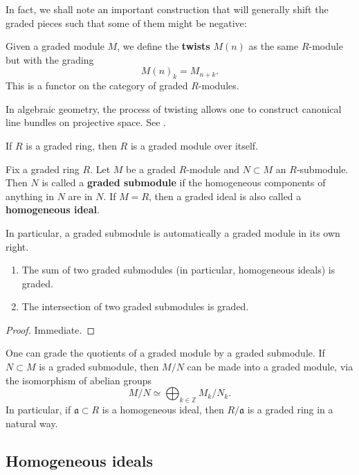 In fact, we shall note an important construction that will generally shift
the graded pieces such that some of them might be negative:

\begin{definition} 
Given a graded module $M$, we define the \textbf{twists} $M(n)$ as the
same $R$-module but with the grading
\[  M(n)_k = M_{n+k} . \]  
This is a functor on the category of graded $R$-modules.
\end{definition} 

In algebraic geometry, the process of twisting allows one to construct
canonical line bundles on projective space. See \cite{Ha77}.

\begin{example} 
If $R$ is  a graded ring, then $R$ is a graded module over itself. 
\end{example} 

\begin{definition} Fix a graded ring $R$.
Let $M$ be a graded $R$-module and $N \subset M$ an $R$-submodule. Then $N$ is
called a
\textbf{graded submodule} if the homogeneous components of anything in $N$ are
in $N$. If $M=R$, then a graded ideal is also called a \textbf{homogeneous
ideal}.
\end{definition} 

In particular, a graded submodule is automatically a graded module in its own
right. 

\begin{lemma} 
\begin{enumerate}
\item The sum of two graded submodules (in particular, homogeneous ideals) is
graded.
\item  The intersection of two graded submodules is graded.
\end{enumerate}
\end{lemma} 
\begin{proof} 
Immediate.
\end{proof} 

One can grade the quotients of a graded module by a graded submodule.
If $N \subset M$ is a graded submodule, then $M/N$ can be made into a graded
module,  via the isomorphism of abelian groups
\[  M/N \simeq \bigoplus_{k \in \mathbb{Z}} M_k/N_k.  \]
In particular, if $\mathfrak{a} \subset R$ is a homogeneous ideal, then 
$R/\mathfrak{a}$ is a graded ring in a natural way.


\subsection{Homogeneous ideals}

